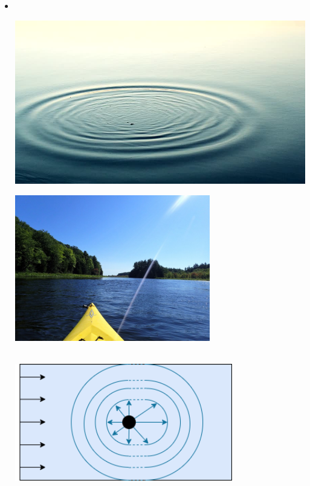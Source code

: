 \begin{frame}
\begin{minipage}{0.45\textwidth}
\begin{itemize}
\item<1->[] 
\centering
{}\\[0.5cm]
\hspace{0.2cm}
\begin{minipage}{0.4\textwidth}
\includegraphics[width=1\textwidth]{Resources/Images/waves.jpg}
\end{minipage}
\begin{minipage}{0.45\textwidth}
\includegraphics[width=0.67\textwidth]{Resources/Images/paddle.jpg}
\end{minipage}\\[0.5cm]
\hspace{0.25cm}
\includegraphics[width=0.75\textwidth]{Resources/Images/subcritical.png}

\end{itemize}
\end{minipage}
\end{frame}
